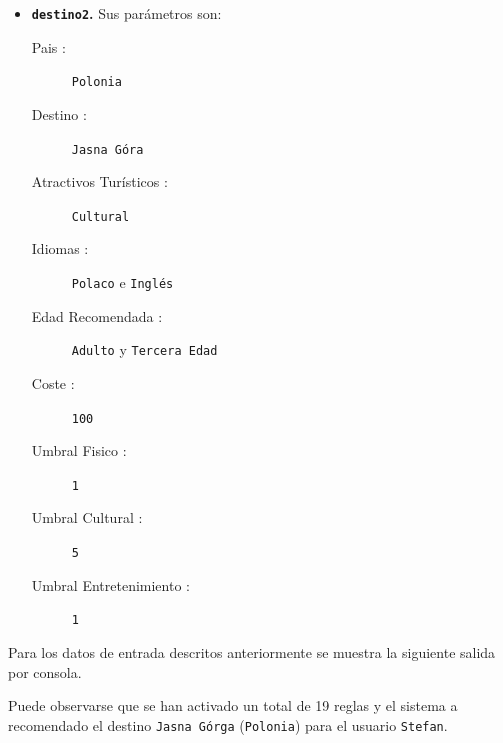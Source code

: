 \documentclass[10pt,a4paper]{report}
\begin{document}
\begin{itemize}
	
	\item \textbf{\texttt{destino2}.} Sus parámetros son:
		\begin{description}
			\item[Pais :] \texttt{Polonia}
			\item[Destino :] \texttt{Jasna Góra}
			\item[Atractivos Turísticos :] \texttt{Cultural}
			\item[Idiomas :] \texttt{Polaco} e \texttt{Inglés}
			\item[Edad Recomendada :] \texttt{Adulto} y \texttt{Tercera Edad}
			\item[Coste :] \texttt{100}
			\item[Umbral Fisico :] \texttt{1}
			\item[Umbral Cultural :] \texttt{5}
			\item[Umbral Entretenimiento :] \texttt{1}
		\end{description}
	\end{itemize}
	
	Para los datos de entrada descritos anteriormente se muestra la siguiente salida por consola.	
	
	
	
	Puede observarse que se han activado un total de 19 reglas y el sistema a recomendado el destino \texttt{Jasna Górga} (\texttt{Polonia}) para el usuario \texttt{Stefan}.
\end{document}
